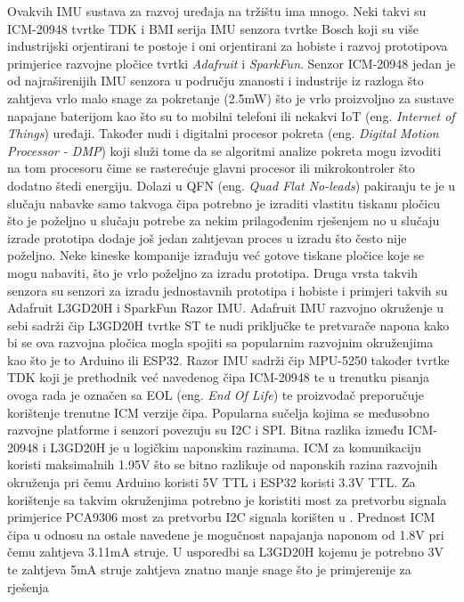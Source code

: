 \documentclass[times, utf8, diplomski]{fer}
\begin{document}
Ovakvih IMU sustava za razvoj uređaja na tržištu ima mnogo. Neki takvi su ICM-20948 tvrtke TDK i BMI serija IMU senzora tvrtke
Bosch koji su više industrijski orjentirani te postoje i oni orjentirani za hobiste i razvoj prototipova primjerice razvojne pločice
tvrtki \textit{Adafruit} i \textit{SparkFun}. Senzor ICM-20948 jedan je od najraširenijih IMU senzora u području znanosti i
industrije iz razloga što zahtjeva vrlo malo snage za pokretanje (2.5mW) \citep{ICM} što je vrlo proizvoljno 
za sustave napajane baterijom kao što su to mobilni telefoni ili nekakvi IoT (eng. \textit{Internet of Things}) uređaji.
Također nudi i digitalni procesor pokreta (eng. \textit{Digital Motion Processor - DMP}) koji služi tome da se algoritmi analize
pokreta mogu izvoditi na tom procesoru čime se rasterećuje glavni procesor ili mikrokontroler što dodatno štedi energiju. Dolazi u
QFN (eng. \textit{Quad Flat No-leads}) pakiranju te je u slučaju nabavke samo takvoga čipa potrebno je izraditi vlastitu tiskanu
pločicu što je poželjno u slučaju potrebe za nekim prilagođenim rješenjem no u slučaju izrade prototipa dodaje još jedan zahtjevan
proces u izradu što često nije poželjno. Neke kineske kompanije izrađuju već gotove tiskane pločice koje se mogu nabaviti, što je vrlo
poželjno za izradu prototipa. Druga vrsta takvih senzora su senzori za izradu jednostavnih prototipa i hobiste i primjeri takvih su
Adafruit L3GD20H i SparkFun Razor IMU. Adafruit IMU razvojno okruženje u sebi sadrži čip L3GD20H tvrtke ST te nudi priključke te
pretvarače napona kako bi se ova razvojna pločica mogla spojiti sa popularnim razvojnim okruženjima kao što je to Arduino ili
ESP32. Razor IMU sadrži čip MPU-5250 također tvrtke TDK koji je prethodnik već navedenog čipa ICM-20948 te u trenutku pisanja
ovoga rada je označen sa EOL (eng. \textit{End Of Life}) te proizvođač preporučuje korištenje trenutne ICM verzije čipa.
Popularna sučelja kojima se međusobno razvojne platforme i senzori povezuju su I2C i SPI. Bitna razlika između ICM-20948 i L3GD20H
je u logičkim naponskim razinama. ICM za komunikaciju koristi maksimalnih 1.95V \citep{ICM} što se bitno razlikuje od naponskih
razina razvojnih okruženja pri čemu Arduino koristi 5V TTL i ESP32 koristi 3.3V TTL. Za korištenje sa takvim okruženjima potrebno je
koristiti most za pretvorbu signala primjerice PCA9306 most za pretvorbu I2C signala korišten u \cite{mini_data_capture}.
Prednost ICM čipa u odnosu na ostale navedene je mogučnost napajanja naponom od 1.8V pri čemu zahtjeva 3.11mA struje.
U usporedbi sa L3GD20H kojemu je potrebno 3V te zahtjeva 5mA struje zahtjeva znatno manje snage što je primjerenije za rješenja
\end{document}
